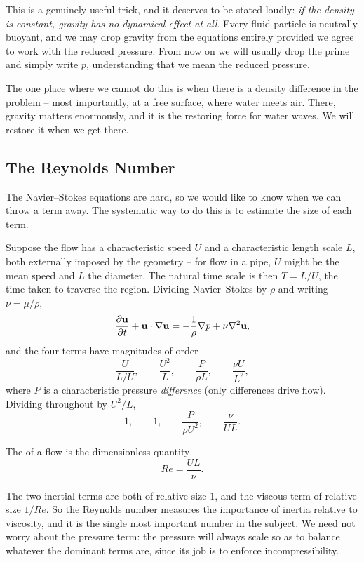 \documentclass[a4paper]{scrartcl}
\newcommand{\pd}[2]{\frac{\partial #1}{\partial #2}}
\newcommand{\Rey}{\mathit{Re}}
\begin{document}
This is a genuinely useful trick, and it deserves to be stated loudly: \emph{if the density is constant, gravity has no dynamical effect at all}. Every fluid particle is neutrally buoyant, and we may drop gravity from the equations entirely provided we agree to work with the reduced pressure. From now on we will usually drop the prime and simply write $p$, understanding that we mean the reduced pressure.

The one place where we cannot do this is when there is a density difference in the problem -- most importantly, at a free surface, where water meets air. There, gravity matters enormously, and it is the restoring force for water waves. We will restore it when we get there.

\subsection{The Reynolds Number}

The Navier--Stokes equations are hard, so we would like to know when we can throw a term away. The systematic way to do this is to estimate the size of each term.

Suppose the flow has a characteristic speed $U$ and a characteristic length scale $L$, both externally imposed by the geometry -- for flow in a pipe, $U$ might be the mean speed and $L$ the diameter. The natural time scale is then $T = L/U$, the time taken to traverse the region. Dividing Navier--Stokes by $\rho$ and writing $\nu = \mu/\rho$,
$$
\pd{\vv u}{t} + \vv u \cdot \nabla \vv u = -\frac{1}{\rho}\nabla p + \nu \nabla^2 \vv u,
$$
and the four terms have magnitudes of order
$$
\frac{U}{L/U}, \qquad \frac{U^2}{L}, \qquad \frac{P}{\rho L}, \qquad \frac{\nu U}{L^2},
$$
where $P$ is a characteristic pressure \emph{difference} (only differences drive flow). Dividing throughout by $U^2/L$,
$$
1, \qquad 1, \qquad \frac{P}{\rho U^2}, \qquad \frac{\nu}{UL}.
$$

\begin{definition}
	The  of a flow is the dimensionless quantity
	$$
	\Rey = \frac{UL}{\nu}.
	$$
\end{definition}

The two inertial terms are both of relative size $1$, and the viscous term of relative size $1/\Rey$. So the Reynolds number measures the importance of inertia relative to viscosity, and it is the single most important number in the subject. We need not worry about the pressure term: the pressure will always scale so as to balance whatever the dominant terms are, since its job is to enforce incompressibility.
\end{document}
